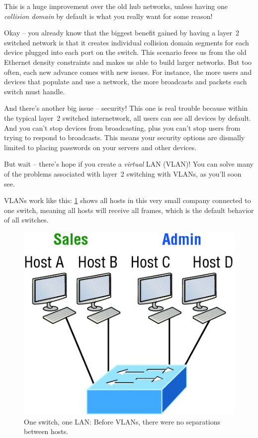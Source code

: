 \documentclass[b5paper,11pt]{memoir}
\begin{document}
This is a huge improvement over the old hub networks, unless having one
\emph{collision domain} by default is what you really want for some
reason!

Okay -- you already know that the biggest benefit gained by having a layer~2 switched network is that it creates individual collision domain
segments for each device plugged into each port on the switch. This
scenario frees us from the old Ethernet density constraints and makes us
able to build larger networks. But too often, each new advance comes
with new issues. For instance, the more users and devices that populate
and use a network, the more broadcasts and packets each switch must
handle.

And there's another
big issue -- security! This one is real trouble because within the
typical layer~2 switched internetwork, all users can see all devices by
default. And you can't stop devices from broadcasting, plus you can't
stop users from trying to respond to broadcasts. This means your
security options are dismally limited to placing passwords on your
servers and other devices.

But wait -- there's hope if you create a \emph{virtual} LAN (VLAN)!
You can solve many of the problems associated with layer~2 switching with VLANs, as you'll soon see.

VLANs work like this: \cref{fig:one-switch-one-lan} shows all hosts in this very small company connected to one switch, meaning all hosts will receive all frames, which is the default behavior of all switches.

\begin{figure}
   \centering
   \includegraphics{images/c11f003.jpg}
   \caption[One switch, one LAN]{One switch, one LAN: Before VLANs, there were no separations between hosts.}
   \label{fig:one-switch-one-lan}
\end{figure}
\end{document}
